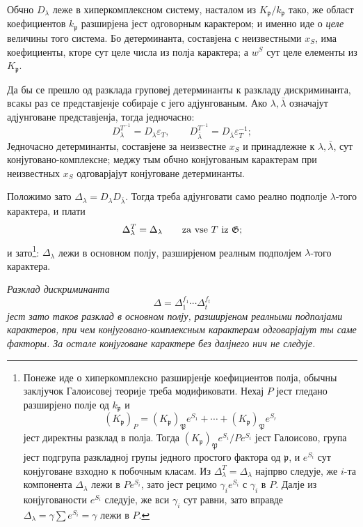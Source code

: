 \documentclass[11pt]{article}
\providecommand{\frakp}{\mathfrak{p}}
\providecommand{\Gg}{\mathfrak{G}}
\begin{document}
Обчно \(D_\lambda\) леже в хиперкомплексном систему, насталом из \(K_\frakp/k_\frakp\) тако, же област коефициентов \(k_\frakp\) разширјена јест одговорным карактером; и именно иде о \emph{целе} величины того система. Бо детерминанта, составјена с неизвестными \(x_S\), има коефициенты, кторе сут целе числа из полја карактера; а \(w^S\) сут целе елементы из \(K_\frakp\).

Да бы се прешло од разклада груповеј детерминанты к разкладу дискриминанта, всакы раз се представјенје собираје с јего адјунгованым. Ако \(\lambda,\bar\lambda\) означајут адјунговане представјенја, тогда једночасно:
\[
        D_\lambda^{T^{-1}}=D_\lambda\varepsilon_T,
        \qquad
        D_{\bar\lambda}^{T^{-1}}=D_{\bar\lambda}\varepsilon_T^{-1};
\]
Једночасно детерминанты, составјене за неизвестне \(x_S\) и принадлежне к \(\lambda,\bar\lambda\), сут конјуговано-комплексне; меджу тым обчно конјугованым карактерам при неизвестных \(x_S\) одговарјајут конјуговане детерминанты.

Положимо зато \(\Delta_\lambda=D_\lambda D_{\bar\lambda}\). Тогда треба адјунговати само реално подполје \(\lambda\)-того карактера, и плати
\[
        \Delta_\lambda^T=\Delta_\lambda
        \qquad\hbox{za vse }T\hbox{ iz }\Gg;
\]
и зато\footnote{Понеже иде о хиперкомплексно разширјенје коефициентов полја, обычны заклјучок Галоисовеј теорије треба модификовати. Нехај \(P\) јест гледано разширјено полје од \(k_\frakp\) и
\[
        (K_\frakp)_P=(K_\frakp)_\mathfrak P e^{S_1}+\cdots+(K_\frakp)_\mathfrak P e^{S_r}
\]
јест директны разклад в полја. Тогда \((K_\frakp)_\mathfrak P e^{S_i}/Pe^{S_i}\) јест Галоисово, група јест подгрупа разкладној групы једного простого фактора од \(\frakp\), и \(e^{S_i}\) сут конјуговане взходно к побочным класам. Из \(\Delta_\lambda^T=\Delta_\lambda\) најпрво следује, же \(i\)-та компонента \(\Delta_\lambda\) лежи в \(Pe^{S_i}\), зато јест рецимо \(\gamma_i e^{S_i}\) с \(\gamma_i\) в \(P\). Далје из конјугованости \(e^{S_i}\) следује, же вси \(\gamma_i\) сут равни, зато вправде \(\Delta_\lambda=\gamma\sum e^{S_i}=\gamma\) лежи в \(P\).}: \(\Delta_\lambda\) лежи в основном полју, разширјеном реалным подполјем \(\lambda\)-того карактера.

\emph{Разклад дискриминанта}
\[
        \Delta=\Delta_1^{f_1}\cdots\Delta_t^{f_t}
\]
\emph{јест зато таков разклад в основном полју, разширјеном реалными подполјами карактеров, при чем конјуговано-комплексным карактерам одговарјајут ты саме факторы. За остале конјуговане карактере без далјнего нич не следује.}
\end{document}

